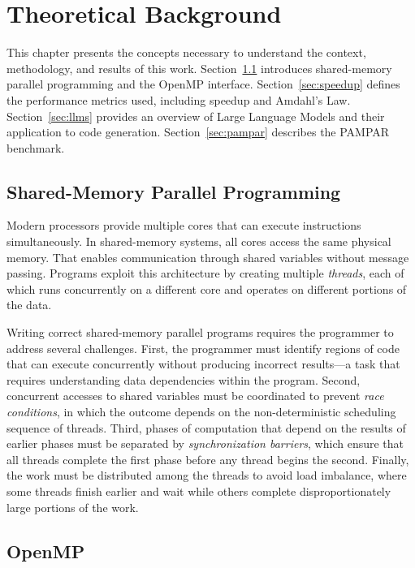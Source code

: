 \chapter{Theoretical Background}\label{cap:background}

This chapter presents the concepts necessary to understand the context, methodology, and results of this work. 
Section~\ref{sec:parallel} introduces shared-memory parallel programming and the OpenMP interface. 
Section~\ref{sec:speedup} defines the performance metrics used, including speedup and Amdahl's Law. 
Section~\ref{sec:llms} provides an overview of Large Language Models and their application to code generation. 
Section~\ref{sec:pampar} describes the PAMPAR benchmark.

\section{Shared-Memory Parallel Programming}
\label{sec:parallel}

Modern processors provide multiple cores that can execute instructions simultaneously. 
In shared-memory systems, all cores access the same physical memory. That enables communication through shared variables without message passing. 
Programs exploit this architecture by creating multiple \textit{threads}, each of which runs concurrently on a different core and operates on different portions of the data.

Writing correct shared-memory parallel programs requires the programmer to address several challenges. 
First, the programmer must identify regions of code that can execute concurrently without producing incorrect results—a task that requires understanding data dependencies within the program. 
Second, concurrent accesses to shared variables must be coordinated to prevent \textit{race conditions}, in which the outcome depends on the non-deterministic scheduling sequence of threads. 
Third, phases of computation that depend on the results of earlier phases must be separated by \textit{synchronization barriers}, which ensure that all threads complete the first phase before any thread begins the second. 
Finally, the work must be distributed among the threads to avoid load imbalance, where some threads finish earlier and wait while others complete disproportionately large portions of the work.

\section{OpenMP}
\label{sec:openmp}


